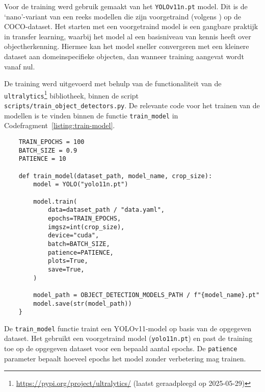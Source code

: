 Voor de training werd gebruik gemaakt van het \texttt{YOLOv11n.pt} model. 
Dit is de `nano'-variant van een reeks modellen die zijn voorgetraind (volgens \textcite{Khanam2024}) op de COCO-dataset.
Het starten met een voorgetraind model is een gangbare praktijk in transfer learning, waarbij het model 
al een basisniveau van kennis heeft over objectherkenning.
Hiermee kan het model sneller convergeren met een kleinere dataset aan domeinspecifieke objecten, dan wanneer training aangevat wordt vanaf nul.

De training werd uitgevoerd met behulp van de functionaliteit van de \texttt{ultralytics}\footnote{\url{https://pypi.org/project/ultralytics/} (laatst geraadpleegd op 2025-05-29)} bibliotheek, 
binnen de script \texttt{scripts/train\_object\_detectors.py}.
De relevante code voor het trainen van de modellen is te vinden binnen de functie \texttt{train\_model} in Codefragment~\ref{listing:train-model}.

\begin{listing}[H]
  \begin{verbatim}
    TRAIN_EPOCHS = 100
    BATCH_SIZE = 0.9
    PATIENCE = 10

    def train_model(dataset_path, model_name, crop_size):
        model = YOLO("yolo11n.pt")

        model.train(
            data=dataset_path / "data.yaml",
            epochs=TRAIN_EPOCHS,
            imgsz=int(crop_size),
            device="cuda",
            batch=BATCH_SIZE,
            patience=PATIENCE,
            plots=True,
            save=True,
        )

        model_path = OBJECT_DETECTION_MODELS_PATH / f"{model_name}.pt"
        model.save(str(model_path))
    }
  \end{verbatim}
  \caption[Functie voor het trainen van YOLOv11-modellen]{
    \label{listing:train-model}
    De \texttt{train\_model} functie traint een YOLOv11-model op basis van de opgegeven dataset.
    Het gebruikt een voorgetraind model (\texttt{yolo11n.pt}) en past de training toe op de opgegeven dataset voor een bepaald aantal epochs.
    De \texttt{patience} parameter bepaalt hoeveel epochs het model zonder verbetering mag trainen.
  }
\end{listing}

